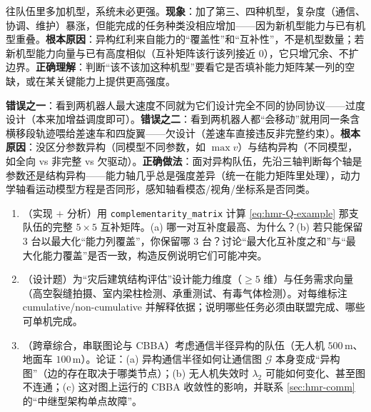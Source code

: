 \begin{pitfall}
往队伍里多加机型，系统未必更强。\textbf{现象}：加了第三、四种机型，复杂度（通信、协调、维护）暴涨，但能完成的任务种类没相应增加——因为新机型能力与已有机型重叠。\textbf{根本原因}：异构红利来自能力的“覆盖性”和“互补性”，不是机型数量；若新机型能力向量与已有高度相似（互补矩阵该行该列接近 $0$），它只增冗余、不扩边界。\textbf{正确理解}：判断“该不该加这种机型”要看它是否填补能力矩阵某一列的空缺，或在某关键能力上提供更高强度。
\end{pitfall}

\begin{pitfall}
\textbf{错误之一}：看到两机器人最大速度不同就为它们设计完全不同的协同协议——过度设计（本来加增益调度即可）。\textbf{错误之二}：看到两机器人都“会移动”就用同一条含横移段轨迹喂给差速车和四旋翼——欠设计（差速车直接违反非完整约束）。\textbf{根本原因}：没区分参数异构（同模型不同参数，如 $\max v$）与结构异构（不同模型，如全向 vs 非完整 vs 欠驱动）。\textbf{正确做法}：面对异构队伍，先沿三轴判断每个轴是参数还是结构异构——能力轴几乎总是强度差异（统一在能力矩阵里处理），动力学轴看运动模型方程是否同形，感知轴看模态/视角/坐标系是否同类。
\end{pitfall}

\begin{practice}
\begin{enumerate}
  \item （实现 $+$ 分析）用 \texttt{complementarity\_matrix} 计算 \cref{eq:hmr-Q-example} 那支队伍的完整 $5\times5$ 互补矩阵。(a) 哪一对互补度最高、为什么？(b) 若只能保留 $3$ 台以最大化“能力列覆盖”，你保留哪 $3$ 台？讨论“最大化互补度之和”与“最大化能力覆盖”是否一致，构造反例说明它们可能冲突。
  \item （设计题）为“灾后建筑结构评估”设计能力维度（$\ge 5$ 维）与任务需求向量（高空裂缝拍摄、室内梁柱检测、承重测试、有毒气体检测）。对每维标注 cumulative/non-cumulative 并解释依据；说明哪些任务必须由联盟完成、哪些可单机完成。
  \item （跨章综合，串联图论与 CBBA）考虑通信半径异构的队伍（无人机 $500\,\mathrm{m}$、地面车 $100\,\mathrm{m}$）。论证：(a) 异构通信半径如何让通信图 $\mathcal{G}$ 本身变成“异构图”（边的存在取决于哪类节点）；(b) 无人机失效时 $\lambda_2$ 可能如何变化、甚至图不连通；(c) 这对图上运行的 CBBA 收敛性的影响，并联系 \cref{sec:hmr-comm} 的“中继型架构单点故障”。
\end{enumerate}
\end{practice}

